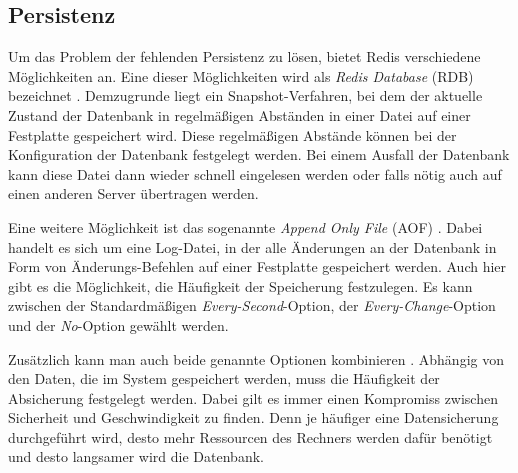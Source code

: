 
\subsection{Persistenz}
Um das Problem der fehlenden Persistenz zu lösen, bietet Redis verschiedene Möglichkeiten an.
Eine dieser Möglichkeiten wird als \textit{Redis Database} (RDB) bezeichnet \cite{Redis-Docs-Persistenz}. 
Demzugrunde liegt ein Snapshot-Verfahren, bei dem der aktuelle Zustand der Datenbank in regelmäßigen Abständen in einer Datei auf einer Festplatte gespeichert wird.
Diese regelmäßigen Abstände können bei der Konfiguration der Datenbank festgelegt werden. 
Bei einem Ausfall der Datenbank kann diese Datei dann wieder schnell eingelesen werden oder falls nötig auch auf einen anderen Server übertragen werden.

Eine weitere Möglichkeit ist das sogenannte \textit{Append Only File} (AOF) \cite{Redis-Docs-Persistenz}. 
Dabei handelt es sich um eine Log-Datei, in der alle Änderungen an der Datenbank in Form von Änderungs-Befehlen auf einer Festplatte gespeichert werden.
Auch hier gibt es die Möglichkeit, die Häufigkeit der Speicherung festzulegen. Es kann zwischen der Standardmäßigen \textit{Every-Second}-Option, der \textit{Every-Change}-Option und der \textit{No}-Option gewählt werden.

Zusätzlich kann man auch beide genannte Optionen kombinieren \cite{Redis-Docs-Persistenz}.
Abhängig von den Daten, die im System gespeichert werden, muss die Häufigkeit der Absicherung festgelegt werden.
Dabei gilt es immer einen Kompromiss zwischen Sicherheit und Geschwindigkeit zu finden.
Denn je häufiger eine Datensicherung durchgeführt wird, desto mehr Ressourcen des Rechners werden dafür benötigt und desto langsamer wird die Datenbank.